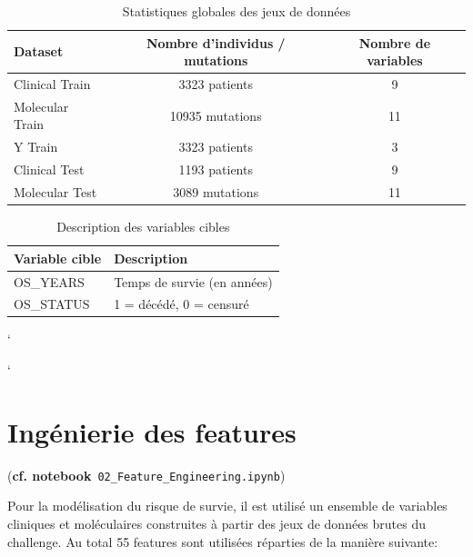 \documentclass[12pt,a4paper]{article}
\begin{document}
\begin{table}[h!]
    \centering
    \begin{tabular}{lcc}
        \hline
        \textbf{Dataset} & \textbf{Nombre d'individus / mutations} & \textbf{Nombre de variables} \\
        \hline
        Clinical Train   & 3323 patients   & 9  \\
        Molecular Train  & 10935 mutations & 11 \\
        Y Train          & 3323 patients   & 3  \\
        \hline
        Clinical Test    & 1193 patients   & 9  \\
        Molecular Test   & 3089 mutations  & 11 \\
        \hline
    \end{tabular}
    \caption{Statistiques globales des jeux de données}
\end{table}
\begin{table}[h!]
    \centering
    \begin{tabular}{l l}
        \hline
        \textbf{Variable cible} & \textbf{Description} \\
        \hline
        OS\_YEARS  & Temps de survie (en années) \\
        OS\_STATUS & 1 = décédé, 0 = censuré \\
        \hline
    \end{tabular}
    \caption{Description des variables cibles}
\end{table}`
\newpage

\vspace{2cm}

`
\section{Ingénierie des features}
\noindent(\textbf{cf. notebook}~\texttt{02\_Feature\_Engineering.ipynb})

Pour la modélisation du risque de survie, il est utilisé un ensemble de variables cliniques et moléculaires construites à partir des jeux de données brutes du challenge. Au total 55 features sont utilisées réparties de la manière suivante:
\end{document}
